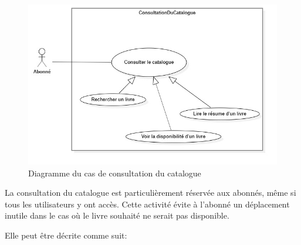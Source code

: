 \paragraph{}
\begin{figure}[h]
        \centering
        \includegraphics[width=1\textwidth]{consultationDuCatalogueUseCase}
        \caption{Diagramme du cas de consultation du catalogue}
        \label{image-consultationDuCatalogueUseCase}
        \end{figure}
\par
La consultation du catalogue est particulièrement réservée aux abonnés, même si 
tous les utilisateurs y ont accès. Cette activité évite à l'abonné un déplacement
inutile dans le cas où le livre souhaité ne serait pas disponible. \par 
Elle peut être décrite comme suit: \par 
